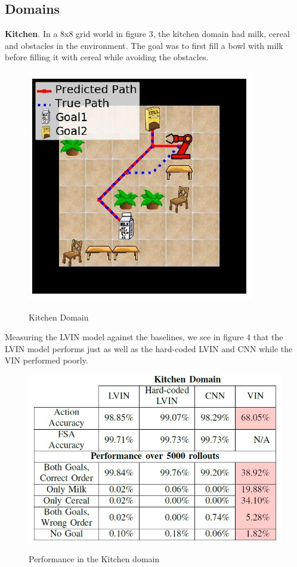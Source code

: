 \documentclass[letterpaper, 10 pt, conference]{ieeeconf}  %
\begin{document}
\subsection{Domains}
\textbf{Kitchen}. In a 8x8 grid world in figure 3, the kitchen domain had milk, cereal and obstacles in the environment. The goal was to first fill a bowl with milk before filling it with cereal while avoiding the obstacles.
\begin{figure}[h]
 \centering
 \includegraphics[scale=.6]{Kitchen.JPG}\\
 \caption{Kitchen Domain}
\end{figure}
Measuring the LVIN model against the baselines, we see in figure 4 that the LVIN model performs just as well as the hard-coded LVIN and CNN while the VIN performed poorly.
\begin{figure}[h]
 \centering
 \includegraphics[scale=.6]{KitchenResults.JPG}\\
 \caption{Performance in the Kitchen domain}
\end{figure}
\end{document}
